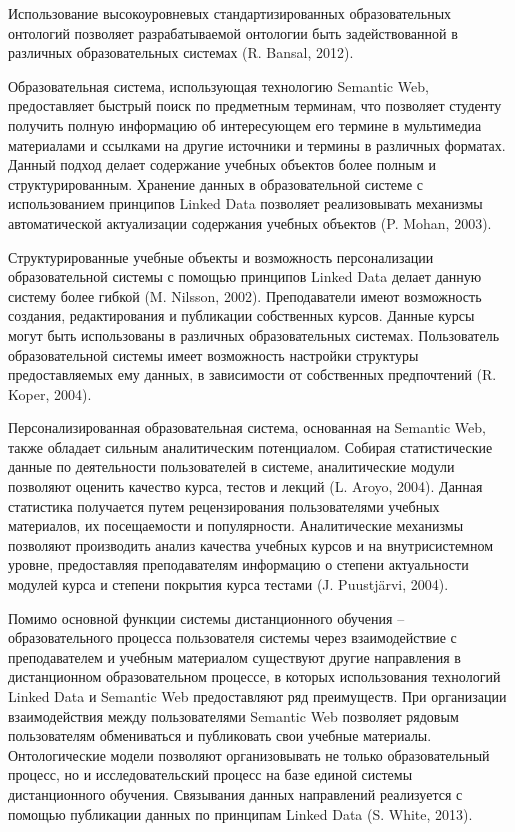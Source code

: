 Использование высокоуровневых стандартизированных образовательных онтологий позволяет разрабатываемой онтологии быть задействованной в различных образовательных системах (R. Bansal, 2012). 

Образовательная система, использующая технологию Semantic Web, предоставляет быстрый поиск по предметным терминам, что позволяет студенту получить полную информацию об интересующем его термине в мультимедиа материалами и ссылками на другие источники и термины в различных форматах. Данный подход делает содержание учебных объектов более полным и структурированным. Хранение данных в образовательной системе с использованием принципов Linked Data позволяет реализовывать механизмы автоматической актуализации содержания учебных объектов (P. Mohan, 2003). 

Структурированные учебные объекты и возможность персонализации образовательной системы с помощью принципов Linked Data делает  данную систему более гибкой (M. Nilsson, 2002). Преподаватели имеют возможность создания, редактирования и публикации собственных курсов. Данные курсы могут быть использованы в различных образовательных системах. Пользователь образовательной системы имеет возможность настройки структуры предоставляемых ему данных, в зависимости от собственных предпочтений (R. Koper, 2004).  

Персонализированная образовательная система, основанная на Semantic Web, также обладает сильным аналитическим потенциалом.  Собирая статистические данные по деятельности пользователей в системе, аналитические модули позволяют оценить качество курса, тестов и лекций (L. Aroyo, 2004). Данная статистика получается путем рецензирования пользователями учебных материалов, их посещаемости и популярности. Аналитические механизмы позволяют производить анализ качества учебных курсов и на внутрисистемном уровне, предоставляя преподавателям информацию о степени актуальности модулей курса и степени покрытия курса тестами (J. Puustjärvi, 2004).  

Помимо основной функции системы дистанционного обучения – образовательного процесса  пользователя системы через взаимодействие с преподавателем и учебным материалом существуют другие направления в дистанционном образовательном процессе, в которых использования технологий Linked Data и Semantic Web предоставляют ряд преимуществ. При организации взаимодействия между пользователями Semantic Web позволяет рядовым пользователям обмениваться и публиковать свои учебные материалы. Онтологические модели позволяют организовывать не только образовательный процесс, но и исследовательский процесс на базе единой системы дистанционного обучения. Связывания данных направлений реализуется с помощью публикации данных по принципам Linked Data (S. White, 2013). 

